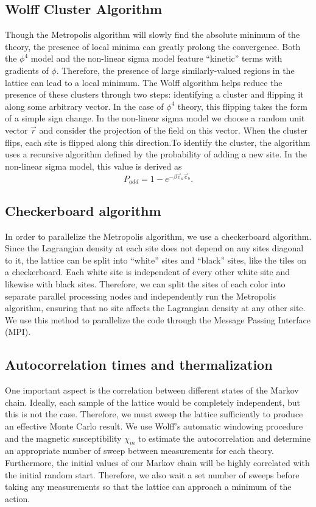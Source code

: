 \documentclass[12pt]{report}
\newcommand{\citeneeded}{}
\begin{document}
\subsection{Wolff Cluster Algorithm}

Though the Metropolis algorithm will slowly find the absolute minimum of the theory, the presence of local minima can greatly prolong the convergence. Both the $\phi^4$ model and the non-linear sigma model feature ``kinetic'' terms with gradients of $\phi$. Therefore, the presence of large similarly-valued regions in the lattice can lead to a local minimum. The Wolff algorithm helps reduce the presence of these clusters through two steps: identifying a cluster and flipping it along some arbitrary vector. In the case of $\phi^4$ theory, this flipping takes the form of a simple sign change. In the non-linear sigma model we choose a random unit vector $\vec r$ and consider the projection of the field on this vector. When the cluster flips, each site is flipped along this direction.\citeneeded To identify the cluster, the algorithm uses a recursive algorithm defined by the probability of adding a new site. In the non-linear sigma model, this value is derived as 
\begin{equation}
    P_{add} = 1-e^{- \beta \vec e_a\vec e_b}.
\end{equation}


\subsection{Checkerboard algorithm}

In order to parallelize the Metropolis algorithm, we use a checkerboard algorithm. Since the Lagrangian density at each site does not depend on any sites diagonal to it, the lattice can be split into ``white'' sites and ``black'' sites, like the tiles on a checkerboard. Each white site is independent of every other white site and likewise with black sites. Therefore, we can split the sites of each color into separate parallel processing nodes and independently run the Metropolis algorithm, ensuring that no site affects the Lagrangian density at any other site. We use this method to parallelize the code through the Message Passing Interface (MPI).

\subsection{Autocorrelation times and thermalization}
One important aspect is the correlation between different states of the Markov chain. Ideally, each sample of the lattice would be completely independent, but this is not the case. Therefore, we must sweep the lattice sufficiently to produce an effective Monte Carlo result. We use Wolff's automatic windowing procedure \cite{wolff2007} and the magnetic susceptibility $\chi_m$ to estimate the autocorrelation and determine an appropriate number of sweep between measurements for each theory. Furthermore, the initial values of our Markov chain will be highly correlated with the initial random start. Therefore, we also wait a set number of sweeps before taking any measurements so that the lattice can approach a minimum of the action.
\end{document}
